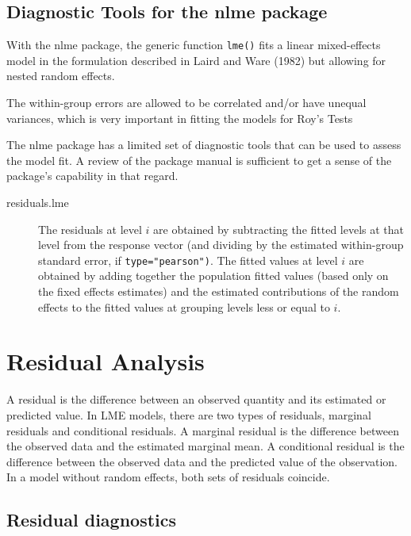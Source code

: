 \documentclass[Main.tex]{subfiles}
\begin{document}
\newpage
\section{Diagnostic Tools for the nlme package}


With the nlme package, the generic function \texttt{lme()} fits a linear mixed-effects model in the formulation described in Laird and Ware (1982) but allowing for nested random effects. 

The within-group errors are allowed to be correlated and/or have unequal variances, which is very important in fitting the models for Roy's Tests

The nlme package has a limited set of diagnostic tools that can be used to assess the model fit. A review of the package manual is sufficient to get a sense of the package's capability in that regard.

\begin{description}
	\item[residuals.lme] 
	The residuals at level $i$ are obtained by subtracting the fitted levels at that level from the response
	vector (and dividing by the estimated within-group standard error, if \texttt{type="pearson")}. The fitted
	values at level $i$ are obtained by adding together the population fitted values (based only on the
	fixed effects estimates) and the estimated contributions of the random effects to the fitted values at
	grouping levels less or equal to $i$.
\end{description}


\chapter{Residual Analysis}
A residual is the difference between an observed quantity and its estimated or predicted value. In LME models, there are two types of residuals, marginal residuals and conditional residuals. A marginal residual is the difference between the observed data and the estimated marginal mean. A conditional residual is the difference between the observed data and the predicted value of the observation. In a model without random effects, both sets of residuals coincide.

\section{Residual diagnostics} %
\end{document}
